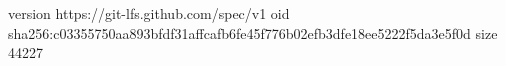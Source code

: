 version https://git-lfs.github.com/spec/v1
oid sha256:c03355750aa893bfdf31affcafb6fe45f776b02efb3dfe18ee5222f5da3e5f0d
size 44227
